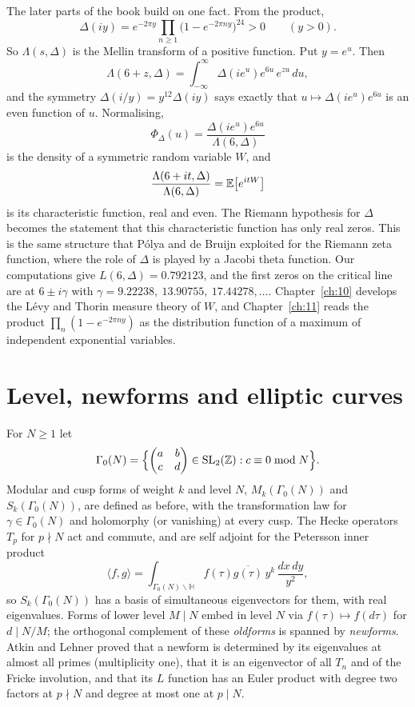 The later parts of the book build on one fact. From the product,
\[
\Delta(iy)=e^{-2\pi y}\prod_{n\ge1}\bigl(1-e^{-2\pi ny}\bigr)^{24}>0\qquad(y>0).
\]
So $\Lambda(s,\Delta)$ is the Mellin transform of a positive function. Put $y=e^u$. Then
\[
\Lambda(6+z,\Delta)=\int_{-\infty}^\infty\Delta(ie^u)e^{6u}\,e^{zu}\,du,
\]
and the symmetry $\Delta(i/y)=y^{12}\Delta(iy)$ says exactly that $u\mapsto\Delta(ie^u)e^{6u}$ is an even function of $u$. Normalising,
\[
\Phi_\Delta(u)=\frac{\Delta(ie^u)e^{6u}}{\Lambda(6,\Delta)}
\]
is the density of a symmetric random variable $W$, and
\[
\frac{\Lambda(6+it,\Delta)}{\Lambda(6,\Delta)}=\mathbb{E}\bigl[e^{itW}\bigr]
\]
is its characteristic function, real and even. The Riemann hypothesis for $\Delta$ becomes the statement that this characteristic function has only real zeros. This is the same structure that P\'olya \cite{polya1926} and de Bruijn \cite{debruijn1950} exploited for the Riemann zeta function, where the role of $\Delta$ is played by a Jacobi theta function. Our computations give $L(6,\Delta)=0.792123$, and the first zeros on the critical line are at $6\pm i\gamma$ with $\gamma=9.22238,\ 13.90755,\ 17.44278,\dots$. Chapter~\ref{ch:10} develops the L\'evy and Thorin measure theory of $W$, and Chapter~\ref{ch:11} reads the product $\prod_n(1-e^{-2\pi ny})$ as the distribution function of a maximum of independent exponential variables.

\section{Level, newforms and elliptic curves}\label{sec:02level}

For $N\ge1$ let
\[
\Gamma_0(N)=\Bigl\{\begin{pmatrix}a&b\\c&d\end{pmatrix}\in\mathrm{SL}_2(\mathbb{Z}):c\equiv0\bmod N\Bigr\}.
\]
Modular and cusp forms of weight $k$ and level $N$, $M_k(\Gamma_0(N))$ and $S_k(\Gamma_0(N))$, are defined as before, with the transformation law for $\gamma\in\Gamma_0(N)$ and holomorphy (or vanishing) at every cusp. The Hecke operators $T_p$ for $p\nmid N$ act and commute, and are self adjoint for the Petersson inner product
\[
\langle f,g\rangle=\int_{\Gamma_0(N)\backslash\mathbb H}f(\tau)\overline{g(\tau)}\,y^k\,\frac{dx\,dy}{y^2},
\]
so $S_k(\Gamma_0(N))$ has a basis of simultaneous eigenvectors for them, with real eigenvalues. Forms of lower level $M\mid N$ embed in level $N$ via $f(\tau)\mapsto f(d\tau)$ for $d\mid N/M$; the orthogonal complement of these \emph{oldforms} is spanned by \emph{newforms}. Atkin and Lehner \cite{atkinlehner1970} proved that a newform is determined by its eigenvalues at almost all primes (multiplicity one), that it is an eigenvector of all $T_n$ and of the Fricke involution, and that its $L$ function has an Euler product with degree two factors at $p\nmid N$ and degree at most one at $p\mid N$.

